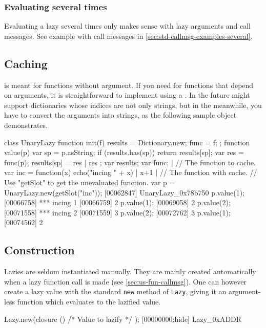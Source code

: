 \subsubsection{Evaluating several times}

Evaluating a lazy several times only makes sense with lazy arguments
and call messages. See example with call messages in
\autoref{sec:std-callmsg-examples-several}.


\subsection{Caching}

 is meant for functions without argument.  If you need
 for functions that depend on arguments, it is
straightforward to implement using a .  In the
future \us might support dictionaries whose indices are not only
strings, but in the meanwhile, you have to convert the arguments into
strings, as the following sample object demonstrates.

\begin{urbiscript}[firstnumber=last]
class UnaryLazy
{
  function init(f)
  {
    results = Dictionary.new;
    func = f;
  };
  function value(p)
  {
    var sp = p.asString;
    if (results.has(sp))
      return results[sp];
    var res = func(p);
    results[sp] = res |
    res
  };
  var results;
  var func;
} |
// The function to cache.
var inc = function(x) { echo("incing " + x) | x+1 } |
// The function with cache.
// Use "getSlot" to get the unevaluated function.
var p = UnaryLazy.new(getSlot("inc"));
[00062847] UnaryLazy_0x78b750
p.value(1);
[00066758] *** incing 1
[00066759] 2
p.value(1);
[00069058] 2
p.value(2);
[00071558] *** incing 2
[00071559] 3
p.value(2);
[00072762] 3
p.value(1);
[00074562] 2
\end{urbiscript}

\subsection{Construction}

Lazies are seldom instantiated manually. They are mainly created
automatically when a lazy function call is made (see
\autoref{sec:us-fun-callmsg}). One can however create a lazy value with the
standard \lstinline|new| method of \lstinline|Lazy|, giving it an
argument-less function which evaluates to the lazified value.

\begin{urbiscript}[firstnumber=last]
Lazy.new(closure () { /* Value to lazify */ });
[00000000:hide] Lazy_0xADDR
\end{urbiscript}

